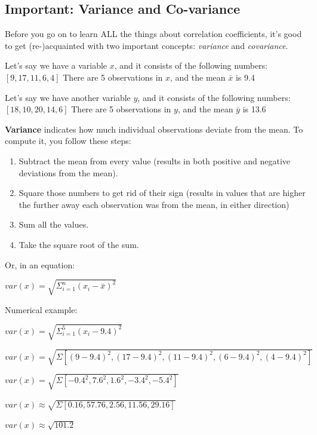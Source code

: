 \documentclass[11pt]{article}
\providecommand{\tightlist}{%
      \setlength{\itemsep}{0pt}\setlength{\parskip}{0pt}}
\begin{document}
    \subsection{\texorpdfstring{\textbf{Important}: Variance and
Co-variance}{Important: Variance and Co-variance}}\label{important-variance-and-co-variance}

Before you go on to learn ALL the things about correlation coefficients,
it's good to get (re-)acquainted with two important concepts:
\emph{variance} and \emph{covariance}.

Let's say we have a variable \(x\), and it consists of the following
numbers: \([9, 17, 11, 6, 4]\) There are 5 observations in \(x\), and
the mean \(\bar{x}\) is 9.4

Let's say we have another variable \(y\), and it consists of the
following numbers: \([18, 10, 20, 14, 6]\) There are 5 observations in
\(y\), and the mean \(\bar{y}\) is 13.6

\textbf{Variance} indicates how much individual observations deviate
from the mean. To compute it, you follow these steps:

\begin{enumerate}
\def\labelenumi{\arabic{enumi}.}
\tightlist
\item
  Subtract the mean from every value (results in both positive and
  negative deviations from the mean).
\item
  Square those numbers to get rid of their sign (results in values that
  are higher the further away each observation was from the mean, in
  either direction)
\item
  Sum all the values.
\item
  Take the square root of the sum.
\end{enumerate}

Or, in an equation:

\(var(x) = \sqrt{\Sigma^{n}_{i=1} (x_{i} - \bar{x})^{2}}\)

Numerical example:

\(var(x) = \sqrt{\Sigma^{5}_{i=1} (x_{i} - 9.4)^{2}}\)

\(var(x) = \sqrt{\Sigma [(9-9.4)^{2}, (17-9.4)^{2}, (11-9.4)^{2}, (6-9.4)^{2}, (4-9.4)^{2}] }\)

\(var(x) = \sqrt{\Sigma [-0.4^{2}, 7.6^{2}, 1.6^{2}, -3.4^{2}, -5.4^{2}]}\)

\(var(x) \approx \sqrt{\Sigma [0.16, 57.76, 2.56, 11.56, 29.16]}\)

\(var(x) \approx \sqrt{101.2}\)
\end{document}
